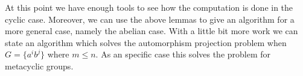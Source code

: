 %
%


At this point we have enough tools to see how the computation is done in the cyclic case. Moreover, we can use the above lemmas
to give an algorithm for a more general case, namely the abelian case. With a little bit more work we can state an algorithm 
which solves the automorphism projection problem when $G = \lbrace a^ib^j \rbrace$ where $m \leq n$. As an specific case this
solves the problem for metacyclic groups.

